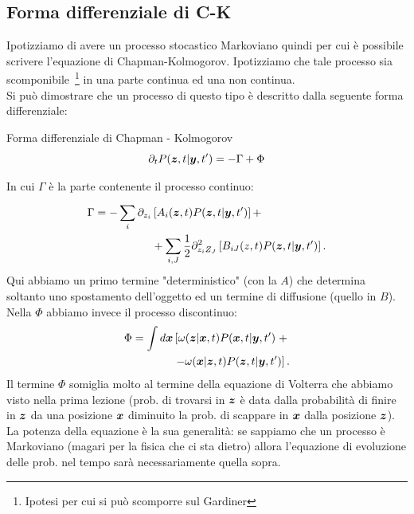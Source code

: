 \subsection{Forma differenziale di C-K}%
\label{sub:Forma differenziale di Chapman - Kolmogorov}
Ipotizziamo di avere un processo stocastico Markoviano quindi per cui è possibile scrivere l'equazione di Chapman-Kolmogorov. Ipotizziamo che tale processo sia scomponibile\
\footnote{Ipotesi per cui si può scomporre sul Gardiner}  in una parte continua ed una non continua.\\
Si può dimostrare che un processo di questo tipo è descritto dalla seguente forma differenziale:
\begin{redbox}{Forma differenziale di Chapman - Kolmogorov}
    \begin{equation}
    \partial_{t}P(\boldsymbol{z},t| \boldsymbol{y}, t') = - \Gamma + \Phi
    \label{eq:4_CK}
    \end{equation}
\end{redbox}
\noindent
In cui $\Gamma$ è la parte contenente il processo continuo:
\[\begin{aligned}
    \Gamma = -\sum_{i}^{} \partial_{z_i}&\left[ A_i(\boldsymbol{z},t) P(\boldsymbol{z},t|\boldsymbol{y},t') \right] +\\
                         &+\sum_{i,J}^{} \frac{1}{2}\partial^2_{z_iZ_J}\left[ B_{iJ}(z,t) P(\boldsymbol{z},t|\boldsymbol{y},t') \right]
.\end{aligned}\]
Qui abbiamo un primo termine "deterministico" (con la $A$) che determina soltanto uno spostamento dell'oggetto ed un termine di diffusione (quello in $B$).\\
Nella $\Phi$ abbiamo invece il processo discontinuo:
\[\begin{aligned}
    \Phi = \int  d\boldsymbol{x} &\left[\omega (\boldsymbol{z}|\boldsymbol{x}, t) P(\boldsymbol{x},t|\boldsymbol{y}, t') \right. + \\
			   & \left. - \omega(\boldsymbol{x} | \boldsymbol{z}, t)  P(\boldsymbol{z},t|\boldsymbol{y},t') \right]
.\end{aligned}\]
Il termine $\Phi$ somiglia molto al termine della equazione di Volterra che abbiamo visto nella prima lezione (prob. di trovarsi in $\boldsymbol{z}$ è data dalla probabilità di finire in $\boldsymbol{z}$ da una posizione $\boldsymbol{x}$ diminuito la prob. di scappare in $\boldsymbol{x}$ dalla posizione $\boldsymbol{z}$).\\
La potenza della equazione è la sua generalità: se sappiamo che un processo è Markoviano (magari per la fisica che ci sta dietro) allora l'equazione di evoluzione delle prob. nel tempo sarà necessariamente quella sopra.
